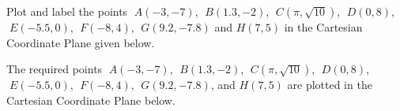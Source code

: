 {
Plot and label the points $\;A(-3, -7)$,  $\;B(1.3, -2)$,  $\;C(\pi, \sqrt{10})$,  $\;D(0, 8)$,  $\;E(-5.5, 0)$,  $\;F(-8, 4)$, $\;G(9.2, -7.8)$ and $H(7, 5)$ in the Cartesian Coordinate Plane given below. 
\label{cartexerciseone}

\begin{center}


\end{center}
}
{
The required points $\;A(-3, -7)$, $\;B(1.3, -2)$, $\;C(\pi, \sqrt{10})$, $\;D(0, 8)$, $\;E(-5.5, 0)$, $\;F(-8, 4)$, $\;G(9.2, -7.8)$, and $H(7, 5)$ are plotted in the Cartesian Coordinate Plane below. 

\begin{center}


\end{center}
}